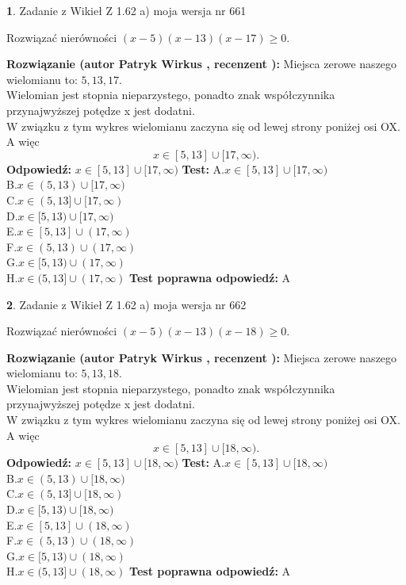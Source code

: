 \documentclass[12pt, a4paper]{article}
\theoremstyle{definition} %
\newtheorem{zad}{}
\newcommand{\zadStart}[1]{\begin{zad}#1\newline}
\newcommand{\zadStop}{\end{zad}}
\newcommand{\rozwStart}[2]{\noindent \textbf{Rozwiązanie (autor #1 , recenzent #2): }\newline}
\newcommand{\rozwStop}{\newline}
\newcommand{\odpStart}{\noindent \textbf{Odpowiedź:}\newline}
\newcommand{\odpStop}{\newline}
\newcommand{\testStart}{\noindent \textbf{Test:}\newline}
\newcommand{\testStop}{\newline}
\newcommand{\kluczStart}{\noindent \textbf{Test poprawna odpowiedź:}\newline}
\newcommand{\kluczStop}{\newline}
\begin{document}
\zadStart{Zadanie z Wikieł Z 1.62 a) moja wersja nr 661}

Rozwiązać nierówności $(x-5)(x-13)(x-17)\ge0$.
\zadStop
\rozwStart{Patryk Wirkus}{}
Miejsca zerowe naszego wielomianu to: $5, 13, 17$.\\
Wielomian jest stopnia nieparzystego, ponadto znak współczynnika przy\linebreak najwyższej potędze x jest dodatni.\\ W związku z tym wykres wielomianu zaczyna się od lewej strony poniżej osi OX. A więc $$x \in [5,13] \cup [17,\infty).$$
\rozwStop
\odpStart
$x \in [5,13] \cup [17,\infty)$
\odpStop
\testStart
A.$x \in [5,13] \cup [17,\infty)$\\
B.$x \in (5,13) \cup [17,\infty)$\\
C.$x \in (5,13] \cup [17,\infty)$\\
D.$x \in [5,13) \cup [17,\infty)$\\
E.$x \in [5,13] \cup (17,\infty)$\\
F.$x \in (5,13) \cup (17,\infty)$\\
G.$x \in [5,13) \cup (17,\infty)$\\
H.$x \in (5,13] \cup (17,\infty)$
\testStop
\kluczStart
A
\kluczStop



\zadStart{Zadanie z Wikieł Z 1.62 a) moja wersja nr 662}

Rozwiązać nierówności $(x-5)(x-13)(x-18)\ge0$.
\zadStop
\rozwStart{Patryk Wirkus}{}
Miejsca zerowe naszego wielomianu to: $5, 13, 18$.\\
Wielomian jest stopnia nieparzystego, ponadto znak współczynnika przy\linebreak najwyższej potędze x jest dodatni.\\ W związku z tym wykres wielomianu zaczyna się od lewej strony poniżej osi OX. A więc $$x \in [5,13] \cup [18,\infty).$$
\rozwStop
\odpStart
$x \in [5,13] \cup [18,\infty)$
\odpStop
\testStart
A.$x \in [5,13] \cup [18,\infty)$\\
B.$x \in (5,13) \cup [18,\infty)$\\
C.$x \in (5,13] \cup [18,\infty)$\\
D.$x \in [5,13) \cup [18,\infty)$\\
E.$x \in [5,13] \cup (18,\infty)$\\
F.$x \in (5,13) \cup (18,\infty)$\\
G.$x \in [5,13) \cup (18,\infty)$\\
H.$x \in (5,13] \cup (18,\infty)$
\testStop
\kluczStart
A
\kluczStop
\end{document}
